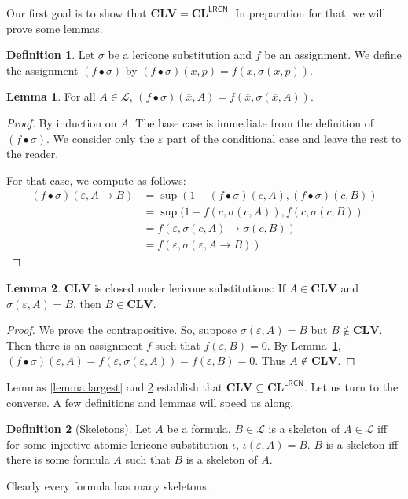 \documentclass{amsart}
\theoremstyle{definition}
\newtheorem{lemma}{Lemma}
\newtheorem{mdef}{Definition}
\newcommand{\LL}{\mathcal{L}}
\newcommand{\LRCN}{\mathsf{LRCN}}
\newcommand{\CLV}{\mathbf{CLV}}
\newcommand{\logic}[1]{{\ensuremath {\mathbf{#1}}}}
\newcommand{\lrcnclose}[1]{#1^{\LRCN}}
\begin{document}
Our first goal is to show that $\CLV=\lrcnclose{\logic{CL}}$. In preparation for that, we will prove some lemmas.

\begin{mdef}
    Let $\sigma$ be a lericone substitution and $f$ be an assignment. We define the assignment $(f\bullet\sigma)$ by $(f\bullet\sigma)(\overline{x},p)=f(\overline{x},\sigma(\overline{x},p))$. 
\end{mdef}

\begin{lemma}\label{Lemma:Bullet}
    For all $A\in\LL$, $(f\bullet\sigma)(\overline{x},A)=f(\overline{x},\sigma(\overline{x},A))$.
\end{lemma}
\begin{proof}
    By induction on $A$. The base case is immediate from the definition of $(f\bullet\sigma)$. We consider only the $\varepsilon$ part of the conditional case and leave the rest to the reader.

    For that case, we compute as follows:
    \begin{align*}
        (f\bullet\sigma)(\varepsilon,A\to B) & = \sup(1-(f\bullet\sigma)(c,A),(f\bullet\sigma)(c,B)) \\
            & = \sup(1-f(c,\sigma(c,A)),f(c,\sigma(c,B)) \\
            & = f(\varepsilon,\sigma(c,A)\to\sigma(c,B)) \\
            & = f(\varepsilon,\sigma(\varepsilon,A\to B))
    \end{align*}
\end{proof}

\begin{lemma}\label{Lemma:SkeletonsValid}
    $\CLV$ is closed under lericone substitutions: If $A\in\CLV$ and $\sigma(\varepsilon,A)=B$, then $B\in\CLV$.
\end{lemma}
\begin{proof}
    We prove the contrapositive. So, suppose $\sigma(\varepsilon,A)=B$ but $B\not\in\CLV$.
    Then there is an assignment $f$ such that $f(\varepsilon, B)=0$. By Lemma~\ref{Lemma:Bullet}, $(f\bullet \sigma)(\varepsilon,A)=f(\varepsilon,\sigma(\varepsilon,A))=f(\varepsilon,B)=0$. Thus $A\not\in\CLV$.
\end{proof}

Lemmas \ref{lemma:largest} and \ref{Lemma:SkeletonsValid} establish that $\CLV\subseteq\lrcnclose{\logic{CL}}$. Let us turn to the converse. A few definitions and lemmas will speed us along.

\begin{mdef}[Skeletons]
    Let $A$ be a formula. $B\in\LL$ is a skeleton of $A\in\LL$ iff for some injective atomic lericone substitution $\iota$, $\iota(\varepsilon, A)=B$. $B$ is a skeleton iff there is some formula $A$ such that  $B$ is a skeleton of $A$.
\end{mdef}
Clearly every formula has many skeletons. 
\end{document}
